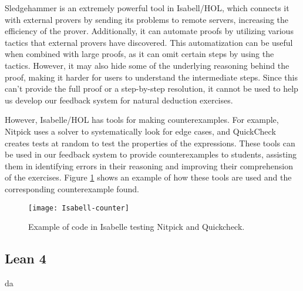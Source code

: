 Sledgehammer is an extremely powerful tool in Isabell/HOL, which connects it with external provers by sending its problems to remote servers, increasing the efficiency of the prover. Additionally, it can automate proofs by utilizing various tactics that external provers have discovered. This automatization can be useful when combined with large proofs, as it can omit certain steps by using the tactics. However, it may also hide some of the underlying reasoning behind the proof, making it harder for users to understand the intermediate steps. Since this can't provide the full proof or a step-by-step resolution, it cannot be used to help us develop our feedback system for natural deduction exercises.

However, Isabelle/HOL has tools for making counterexamples. For example, Nitpick uses a solver to systematically look for edge cases, and QuickCheck creates tests at random to test the properties of the expressions. These tools can be used in our feedback system to provide counterexamples to students, assisting them in identifying errors in their reasoning and improving their comprehension of the exercises. Figure \ref{img:isabell-counter} shows an example of how these tools are used and the corresponding counterexample found.
\begin{figure}[htbp]
    \centering
    \texttt{[image: Isabell-counter]}
    \caption{Example of code in Isabelle testing Nitpick and Quickcheck.}
    \label{img:isabell-counter}
\end{figure}


    
\subsection{Lean 4}
da



